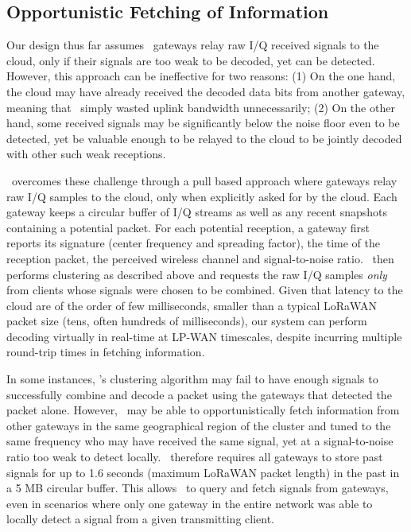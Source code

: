 \subsection{Opportunistic Fetching of Information}
Our design thus far assumes \name\ gateways relay raw I/Q received signals to the cloud, only if their signals are too weak to be decoded, yet can be detected. However, this approach can be ineffective for two reasons: (1) On the one hand, the cloud may have already received the decoded data bits from another gateway, meaning that \name\ simply wasted uplink bandwidth unnecessarily; (2) On the other hand, some received signals may be significantly below the noise floor even to be detected, yet be valuable enough to be relayed to the cloud to be jointly decoded with other such weak receptions.  \vspace*{0.1in}

 \name\ overcomes these challenge through a pull based approach where gateways relay raw I/Q samples to the cloud, only when explicitly asked for by the cloud. Each gateway keeps a circular buffer of I/Q streams as well as any recent snapshots containing a potential packet. For each potential reception, a gateway first reports its signature (center frequency and spreading factor), the time of the reception packet, the perceived wireless channel and signal-to-noise ratio. \name\ then performs clustering as described above and requests the raw I/Q samples {\it only } from clients whose signals were chosen to be combined. Given that latency to the cloud are of the order of few milliseconds, smaller than a typical LoRaWAN packet size (tens, often hundreds of milliseconds), our system can perform decoding virtually in real-time at LP-WAN timescales, despite incurring multiple round-trip times in fetching information.\vspace*{0.1in}

 In some instances, \name's clustering algorithm may fail to have enough signals to successfully combine and decode a packet using the gateways that detected the packet alone. However, \name\ may be able to opportunistically fetch information from other gateways in the same geographical region of the cluster and tuned to the same frequency who may have received the same signal, yet at a signal-to-noise ratio too weak to detect locally. \name\ therefore requires all gateways to store past signals for up to 1.6 seconds (maximum LoRaWAN packet length) in the past in a 5 MB circular buffer. This allows \name\ to query and fetch signals from gateways, even in scenarios where only one gateway in the entire network was able to locally detect a signal from a given transmitting client. 



